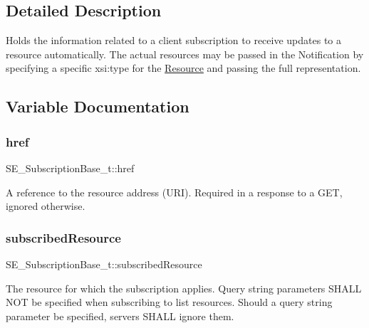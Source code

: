\subsection{Detailed Description}
Holds the information related to a client subscription to receive updates to a resource automatically. The actual resources may be passed in the Notification by specifying a specific xsi\+:type for the \hyperlink{structResource}{Resource} and passing the full representation. 

\subsection{Variable Documentation}
\mbox{\label{group__SubscriptionBase_ga397ee2afb88c8687bccb35b3acec3490}} 
\subsubsection{\texorpdfstring{href}{href}}
{\footnotesize\ttfamily S\+E\+\_\+\+Subscription\+Base\+\_\+t\+::href}

A reference to the resource address (U\+RI). Required in a response to a G\+ET, ignored otherwise. \mbox{\label{group__SubscriptionBase_ga20d85c9e20b561f7f7d7aa3b337c0e4f}} 
\subsubsection{\texorpdfstring{subscribed\+Resource}{subscribedResource}}
{\footnotesize\ttfamily S\+E\+\_\+\+Subscription\+Base\+\_\+t\+::subscribed\+Resource}

The resource for which the subscription applies. Query string parameters S\+H\+A\+LL N\+OT be specified when subscribing to list resources. Should a query string parameter be specified, servers S\+H\+A\+LL ignore them. 